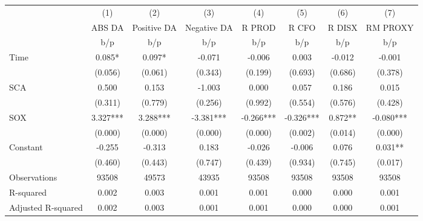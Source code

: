 {
\def\sym#1{\ifmmode^{#1}\else\(^{#1}\)\fi}
\begin{tabular}{l*{7}{c}}
\hline\hline
                    &\multicolumn{1}{c}{(1)}&\multicolumn{1}{c}{(2)}&\multicolumn{1}{c}{(3)}&\multicolumn{1}{c}{(4)}&\multicolumn{1}{c}{(5)}&\multicolumn{1}{c}{(6)}&\multicolumn{1}{c}{(7)}\\
                    &\multicolumn{1}{c}{ABS DA}&\multicolumn{1}{c}{Positive DA}&\multicolumn{1}{c}{Negative DA}&\multicolumn{1}{c}{R PROD}&\multicolumn{1}{c}{R CFO}&\multicolumn{1}{c}{R DISX}&\multicolumn{1}{c}{RM PROXY}\\
                    &         b/p   &         b/p   &         b/p   &         b/p   &         b/p   &         b/p   &         b/p   \\
\hline
Time                &       0.085*  &       0.097*  &      -0.071   &      -0.006   &       0.003   &      -0.012   &      -0.001   \\
                    &     (0.056)   &     (0.061)   &     (0.343)   &     (0.199)   &     (0.693)   &     (0.686)   &     (0.378)   \\
SCA                 &       0.500   &       0.153   &      -1.003   &       0.000   &       0.057   &       0.186   &       0.015   \\
                    &     (0.311)   &     (0.779)   &     (0.256)   &     (0.992)   &     (0.554)   &     (0.576)   &     (0.428)   \\
SOX                 &       3.327***&       3.288***&      -3.381***&      -0.266***&      -0.326***&       0.872** &      -0.080***\\
                    &     (0.000)   &     (0.000)   &     (0.000)   &     (0.000)   &     (0.002)   &     (0.014)   &     (0.000)   \\
Constant            &      -0.255   &      -0.313   &       0.183   &      -0.026   &      -0.006   &       0.076   &       0.031** \\
                    &     (0.460)   &     (0.443)   &     (0.747)   &     (0.439)   &     (0.934)   &     (0.745)   &     (0.017)   \\
\hline
Observations        &       93508   &       49573   &       43935   &       93508   &       93508   &       93508   &       93508   \\
R-squared           &       0.002   &       0.003   &       0.001   &       0.001   &       0.000   &       0.000   &       0.001   \\
Adjusted R-squared  &       0.002   &       0.003   &       0.001   &       0.001   &       0.000   &       0.000   &       0.001   \\
\hline\hline
\end{tabular}
}
